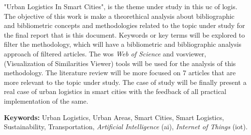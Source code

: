 
\begin{secondlangabstract}%

"Urban Logistics In Smart Cities", is the theme under study in this \gls{uc} of \gls{logis}.
The objective of this work is make a theorethical analysis about bibliographic and bibliometric concepts and methodologies related to the topic under study for the final report that is this document.
Keywords or key terms will be explored to filter the methodology, which will have a bibliometric and bibliographic analysis approach of filtered articles.
The \gls{wos} \textit{Web of Science} and \gls{vosviewer}, (Visualization of Similarities Viewer) tools will be used for the analysis of this methodology.
The literature review will be more focused on 7 articles that are more relevant to the topic under study.
The case of study will be finally present a real case of urban logistics in smart cities with the feedback of all practical implementation of the same.


\vspace{5cm}
\textbf{Keywords:} Urban Logistics, Urban Areas, Smart Cities, Smart Logistics, Sustainability, Transportation, \textit{Artificial Intelligence} (\gls{ai}), \textit{Internet of Things} (\gls{iot}).
\end{secondlangabstract}

